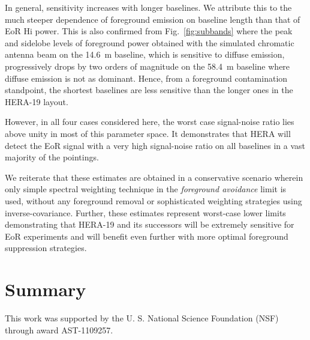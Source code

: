 \documentclass[preprint2,iop,numberedappendix,twocolappendix,appendixfloats]{emulateapj}
\begin{document}
In general, sensitivity increases with longer baselines. We attribute this to the much steeper dependence of foreground emission on baseline length than that of EoR H{\sc i} power. This is also confirmed from Fig.~\ref{fig:subbands} where the peak and sidelobe levels of foreground power obtained with the simulated chromatic antenna beam on the 14.6~m baseline, which is sensitive to diffuse emission, progressively drops by two orders of magnitude on the 58.4~m baseline where diffuse emission is not as dominant. Hence, from a foreground contamination standpoint, the shortest baselines are less sensitive than the longer ones in the HERA-19 layout.

However, in all four cases considered here, the worst case signal-noise ratio lies above unity in most of this parameter space. It demonstrates that HERA will detect the EoR signal with a very high signal-noise ratio on all baselines in a vast majority of the pointings. 

We reiterate that these estimates are obtained in a conservative scenario wherein only simple spectral weighting technique in the {\it foreground avoidance} limit is used, without any foreground removal or sophisticated weighting strategies using inverse-covariance. Further, these estimates represent worst-case lower limits demonstrating that HERA-19 and its successors will be extremely sensitive for EoR experiments and will benefit even further with more optimal foreground suppression strategies.

\section{Summary}\label{sec:summary}

\acknowledgments

This work was supported by the U. S. National Science Foundation (NSF) through award AST-1109257. 




\end{document}
